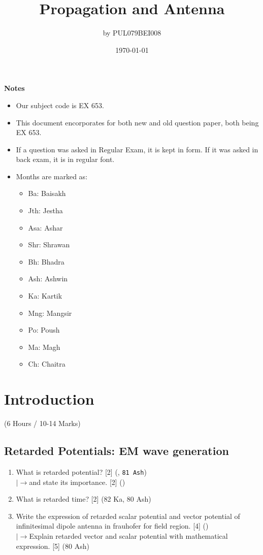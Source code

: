 \documentclass[12pt]{article}
\title{Propagation and Antenna}
\author{by PUL079BEI008}
\date{\today}
\newcommand{\lb}{\\$\left|\rightarrow\right.$}
\begin{document}
\maketitle
\vspace{10.5cm}
\textbf{Notes}
\begin{itemize}[noitemsep]
	\item Our subject code is EX 653.
	\item This document encorporates for both new and old question paper, both being EX 653.
	\item If a question was asked in Regular Exam, it is kept in  form. If it was asked in back exam, it is in regular font.
	\item Months are marked as: 
	\begin{itemize}[noitemsep, topsep=0pt]
		\item Ba: Baisakh
		\item Jth: Jestha
		\item Asa: Ashar
		\item Shr: Shrawan
		\item Bh: Bhadra
		\item Ash: Ashwin
		\item Ka: Kartik
		\item Mng: Mangsir
		\item Po: Poush
		\item Ma: Magh
		\item Ch: Chaitra
	\end{itemize}
\end{itemize}
\pagebreak
\tableofcontents
\pagebreak

\section{Introduction}
  \begin{center} (6 Hours / 10-14 Marks) \end{center}
 
  \subsection{Retarded Potentials: EM wave generation}
    \begin{enumerate}
      \item What is retarded potential? \hfill [2] (, \texttt{81 Ash})
        \lb and state its importance. \hfill [2] ()

      \item What is retarded time? \hfill [2] (82 Ka, 80 Ash)

      \item Write the expression of retarded scalar potential and vector potential of infinitesimal dipole antenna in frauhofer for field region. \hfill [4] ()
        \lb Explain retarded vector and scalar potential with mathematical expression. \hfill [5] (80 Ash)
    \end{enumerate}
\end{document}
